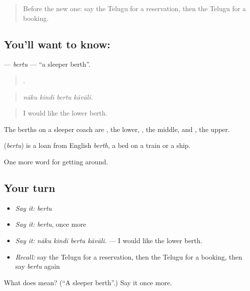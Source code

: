 \begin{quote}
Before the new one: say the Telugu for a reservation, then the Telugu for a booking.
\end{quote}

\subsection*{You'll want to know: }
\textbf{} — \emph{bertu} — \textquotedblleft{}a sleeper berth\textquotedblright{}.

\begin{quote}
   .
\end{quote}

\begin{quote}
\emph{nāku kindi bertu kāvāli.}
\end{quote}

\begin{quote}
I would like the lower berth.
\end{quote}

The berths on a sleeper coach are , the lower, , the middle, and , the upper.

\begin{cousinweb}
\textbf{} (\emph{bertu}) is a loan from English \emph{berth}, a bed on a train or a ship.
\end{cousinweb}

\begin{grammarlens}[title={What you've built}]
One more word for getting around.
\end{grammarlens}

\subsection*{Your turn}
\begin{itemize}
\raggedright
  \item \emph{Say it:} \emph{bertu}
  \item \emph{Say it:} \emph{bertu}, once more
  \item \emph{Say it:} \emph{nāku kindi bertu kāvāli.} — I would like the lower berth.
  \item \emph{Recall:} say the Telugu for a reservation, then the Telugu for a booking, then say \emph{bertu} again
\end{itemize}

\begin{tcolorbox}[breakable,colback=teal!4,colframe=teal!35!black,title={Before you move on}]
What does  mean? (\textquotedblleft{}A sleeper berth\textquotedblright{}.) Say it once more.
\end{tcolorbox}
